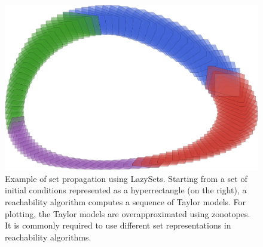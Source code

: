 \begin{figure}[t]
	\centering
	\includegraphics[width=0.7\linewidth, keepaspectratio]{img/lotkavolterra}
	\vspace*{1mm}
	\caption{Example of set propagation using LazySets.
	Starting from a set of initial conditions represented as a hyperrectangle (on the right), a reachability algorithm computes a sequence of Taylor models. For plotting, the Taylor models are overapproximated using zonotopes.
	It is commonly required to use different set representations in reachability algorithms.}
	\label{fig:lotka_volterra}
\end{figure}

